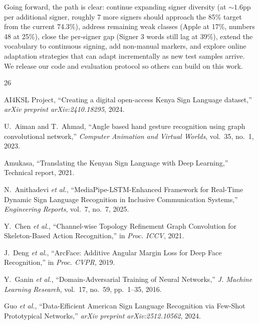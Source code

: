 \documentclass[conference]{IEEEtran}
\begin{document}
Going forward, the path is clear: continue expanding signer diversity (at ${\sim}1.6$pp per additional signer, roughly 7 more signers should approach the 85\% target from the current 74.3\%), address remaining weak classes (Apple at 17\%, numbers 48 at 25\%), close the per-signer gap (Signer 3 words still lag at 39\%), extend the vocabulary to continuous signing, add non-manual markers, and explore online adaptation strategies that can adapt incrementally as new test samples arrive. We release our code and evaluation protocol so others can build on this work.



\begin{thebibliography}{26}

AI4KSL Project, ``Creating a digital open-access Kenya Sign Language dataset,'' \textit{arXiv preprint arXiv:2410.18295}, 2024.

U.~Aiman and T.~Ahmad, ``Angle based hand gesture recognition using graph convolutional network,'' \textit{Computer Animation and Virtual Worlds}, vol.~35, no.~1, 2023.

Amukasa, ``Translating the Kenyan Sign Language with Deep Learning,'' Technical report, 2021.

N.~Anithadevi \textit{et al.}, ``MediaPipe-LSTM-Enhanced Framework for Real-Time Dynamic Sign Language Recognition in Inclusive Communication Systems,'' \textit{Engineering Reports}, vol.~7, no.~7, 2025.

Y.~Chen \textit{et al.}, ``Channel-wise Topology Refinement Graph Convolution for Skeleton-Based Action Recognition,'' in \textit{Proc. ICCV}, 2021.

J.~Deng \textit{et al.}, ``ArcFace: Additive Angular Margin Loss for Deep Face Recognition,'' in \textit{Proc. CVPR}, 2019.

Y.~Ganin \textit{et al.}, ``Domain-Adversarial Training of Neural Networks,'' \textit{J. Machine Learning Research}, vol.~17, no.~59, pp.~1--35, 2016.

Guo \textit{et al.}, ``Data-Efficient American Sign Language Recognition via Few-Shot Prototypical Networks,'' \textit{arXiv preprint arXiv:2512.10562}, 2024.


\end{thebibliography}
\end{document}
